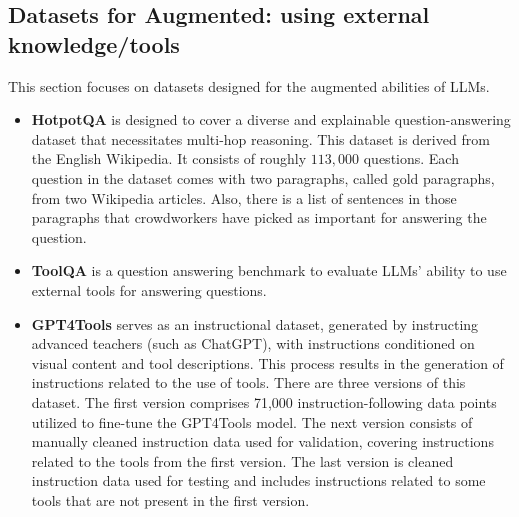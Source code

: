 \documentclass[conference]{IEEEtran}
\begin{document}
\subsection{Datasets for Augmented: using external knowledge/tools}
This section focuses on datasets designed for the augmented abilities of LLMs.

\begin{itemize}
    \item \textbf{HotpotQA} \cite{DBLP:journals/corr/abs-1809-09600} is designed to cover a diverse and explainable question-answering dataset that necessitates multi-hop reasoning.  This dataset is derived from the English Wikipedia. It consists of roughly $113,000$ questions. Each question in the dataset comes with two paragraphs, called gold paragraphs, from two Wikipedia articles. Also, there is a list of sentences in those paragraphs that crowdworkers have picked as important for answering the question.  

    \item \textbf{ToolQA} \cite{zhuang2023toolqa} is a question answering benchmark to evaluate LLMs' ability to use external tools for answering questions. 

    \item \textbf{GPT4Tools} serves as an instructional dataset, generated by instructing advanced teachers (such as ChatGPT), with instructions conditioned on visual content and tool descriptions. This process results in the generation of instructions related to the use of tools. There are three versions of this dataset. The first version comprises 71,000 instruction-following data points utilized to fine-tune the GPT4Tools model. The next version consists of manually cleaned instruction data used for validation, covering instructions related to the tools from the first version. The last version is cleaned instruction data used for testing and includes instructions related to some tools that are not present in the first version.
\end{itemize}
\end{document}
